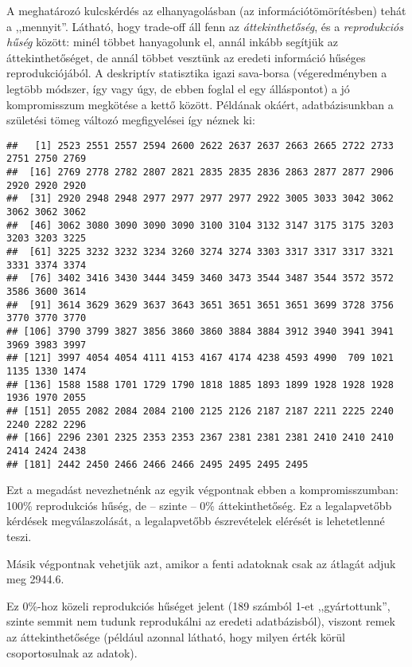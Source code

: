 \documentclass[]{book}
\newenvironment{Shaded}{\begin{snugshade}}{\end{snugshade}}
\newcommand{\NormalTok}[1]{#1}
\newcommand{\OperatorTok}[1]{\textcolor[rgb]{0.81,0.36,0.00}{\textbf{#1}}}
\begin{document}
A meghatározó kulcskérdés az elhanyagolásban (az információtömörítésben) tehát a ,,mennyit''. Látható, hogy trade-off áll fenn az \emph{áttekinthetőség}, és a \emph{reprodukciós hűség} között: minél többet hanyagolunk el, annál inkább segítjük az áttekinthetőséget, de annál többet vesztünk az eredeti információ hűséges reprodukciójából. A deskriptív statisztika igazi sava-borsa (végeredményben a legtöbb módszer, így vagy úgy, de ebben foglal el egy álláspontot) a jó kompromisszum megkötése a kettő között. Példának okáért, adatbázisunkban a születési tömeg változó megfigyelései így néznek ki:

\begin{Shaded}
\end{Shaded}

\begin{verbatim}
##   [1] 2523 2551 2557 2594 2600 2622 2637 2637 2663 2665 2722 2733 2751 2750 2769
##  [16] 2769 2778 2782 2807 2821 2835 2835 2836 2863 2877 2877 2906 2920 2920 2920
##  [31] 2920 2948 2948 2977 2977 2977 2977 2922 3005 3033 3042 3062 3062 3062 3062
##  [46] 3062 3080 3090 3090 3090 3100 3104 3132 3147 3175 3175 3203 3203 3203 3225
##  [61] 3225 3232 3232 3234 3260 3274 3274 3303 3317 3317 3317 3321 3331 3374 3374
##  [76] 3402 3416 3430 3444 3459 3460 3473 3544 3487 3544 3572 3572 3586 3600 3614
##  [91] 3614 3629 3629 3637 3643 3651 3651 3651 3651 3699 3728 3756 3770 3770 3770
## [106] 3790 3799 3827 3856 3860 3860 3884 3884 3912 3940 3941 3941 3969 3983 3997
## [121] 3997 4054 4054 4111 4153 4167 4174 4238 4593 4990  709 1021 1135 1330 1474
## [136] 1588 1588 1701 1729 1790 1818 1885 1893 1899 1928 1928 1928 1936 1970 2055
## [151] 2055 2082 2084 2084 2100 2125 2126 2187 2187 2211 2225 2240 2240 2282 2296
## [166] 2296 2301 2325 2353 2353 2367 2381 2381 2381 2410 2410 2410 2414 2424 2438
## [181] 2442 2450 2466 2466 2466 2495 2495 2495 2495
\end{verbatim}

Ezt a megadást nevezhetnénk az egyik végpontnak ebben a kompromisszumban: 100\% reprodukciós hűség, de -- szinte -- 0\% áttekinthetőség. Ez a legalapvetőbb kérdések megválaszolását, a legalapvetőbb észrevételek elérését is lehetetlenné teszi.

Másik végpontnak vehetjük azt, amikor a fenti adatoknak csak az átlagát adjuk meg 2944.6.

Ez 0\%-hoz közeli reprodukciós hűséget jelent (189 számból 1-et ,,gyártottunk'', szinte semmit nem tudunk reprodukálni az eredeti adatbázisból), viszont remek az áttekinthetősége (például azonnal látható, hogy milyen érték körül csoportosulnak az adatok).
\end{document}
